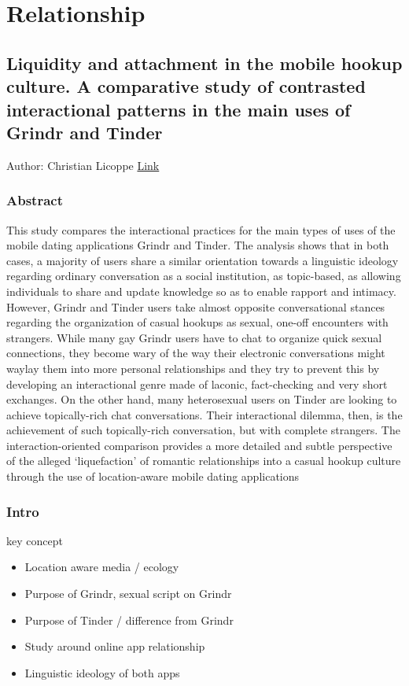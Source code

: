 \chapter{Relationship}

\section{Liquidity and attachment in the mobile hookup culture. A comparative study of contrasted interactional patterns in the main uses of Grindr and Tinder}
Author: Christian Licoppe \href{https://www.tandfonline.com/doi/full/10.1080/17530350.2019.1607530}{Link}

\subsection{Abstract}
This study compares the interactional practices for the main types of uses of the mobile dating applications Grindr and Tinder. The analysis shows that in both cases, a majority of users share a similar orientation towards a linguistic ideology regarding ordinary conversation as a social institution, as topic-based, as allowing individuals to share and update knowledge so as to enable rapport and intimacy. However, Grindr and Tinder users take almost opposite conversational stances regarding the organization of casual hookups as sexual, one-off encounters with strangers. While many gay Grindr users have to chat to organize quick sexual connections, they become wary of the way their electronic conversations might waylay them into more personal relationships and they try to prevent this by developing an interactional genre made of laconic, fact-checking and very short exchanges. On the other hand, many heterosexual users on Tinder are looking to achieve topically-rich chat conversations. Their interactional dilemma, then, is the achievement of such topically-rich conversation, but with complete strangers. The interaction-oriented comparison provides a more detailed and subtle perspective of the alleged ‘liquefaction’ of romantic relationships into a casual hookup culture through the use of location-aware mobile dating applications

\subsection{Intro}
key concept 
    \begin{itemize}
        \item Location aware media / ecology 
        \item Purpose of Grindr, sexual script on Grindr 
        \item Purpose of Tinder / difference from Grindr 
        \item Study around online app relationship 
        \item Linguistic ideology of both apps 
    \end{itemize}

